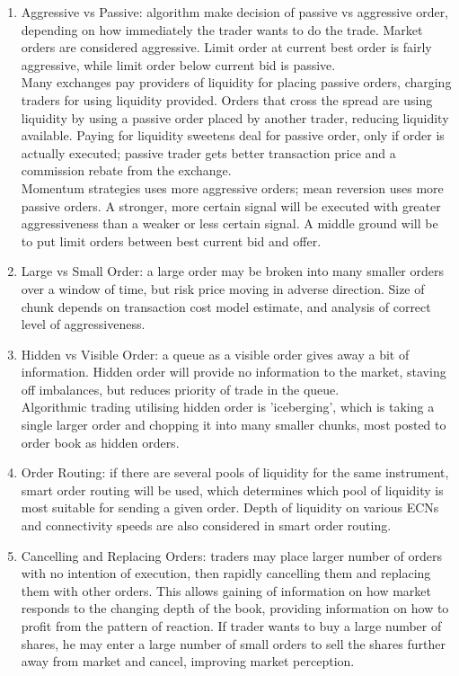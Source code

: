 \begin{remark} 
\begin{enumerate}[label=\roman*.]
\setlength{\itemsep}{0pt}
\item Aggressive vs Passive: algorithm make decision of passive vs aggressive order, depending on how immediately the trader wants to do the trade. Market orders are considered aggressive. Limit order at current best order is fairly aggressive, while limit order below current bid is passive.\\
Many exchanges pay providers of liquidity for placing passive orders, charging traders for using liquidity provided. Orders that cross the spread are using liquidity by using a passive order placed by another trader, reducing liquidity available. Paying for liquidity sweetens deal for passive order, only if order is actually executed; passive trader gets better transaction price and a commission rebate from the exchange.\\
Momentum strategies uses more aggressive orders; mean reversion uses more passive orders. A stronger, more certain signal will be executed with greater aggressiveness than a weaker or less certain signal. A middle ground will be to put limit orders between best current bid and offer.
\item Large vs Small Order: a large order may be broken into many smaller orders over a window of time, but risk price moving in adverse direction. Size of chunk depends on transaction cost model estimate, and analysis of correct level of aggressiveness.
\item Hidden vs Visible Order: a queue as a visible order gives away a bit of information. Hidden order will provide no information to the market, staving off imbalances, but reduces priority of trade in the queue.\\
Algorithmic trading utilising hidden order is 'iceberging', which is taking a single larger order and chopping it into many smaller chunks, most posted to order book as hidden orders.
\item Order Routing: if there are several pools of liquidity for the same instrument, smart order routing will be used, which determines which pool of liquidity is most suitable for sending a given order. Depth of liquidity on various ECNs and connectivity speeds are also considered in smart order routing.
\item Cancelling and Replacing Orders: traders may place larger number of orders with no intention of execution, then rapidly cancelling them and replacing them with other orders. This allows gaining of information on how market responds to the changing depth of the book, providing information on how to profit from the pattern of reaction. If trader wants to buy a large number of shares, he may enter a large number of small orders to sell the shares further away from market and cancel, improving market perception.
\end{enumerate}
\end{remark}

